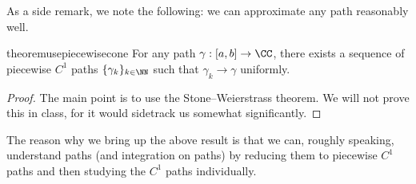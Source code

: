 As a side remark, we note the following: we can approximate any path reasonably well.
\begin{restatable}{theorem}{usepiecewisecone} \label{thm:usepiecewisec1}
	For any path $\gamma:[a,b]\to\CC$, there exists a sequence of piecewise $C^1$ paths $\{\gamma_k\}_{k\in\NN}$ such that $\gamma_k\to\gamma$ uniformly.
\end{restatable}
\begin{proof}
	The main point is to use the Stone--Weierstrass theorem. We will not prove this in class, for it would sidetrack us somewhat significantly.
\end{proof}
The reason why we bring up the above result is that we can, roughly speaking, understand paths (and integration on paths) by reducing them to piecewise $C^1$ paths and then studying the $C^1$ paths individually.

